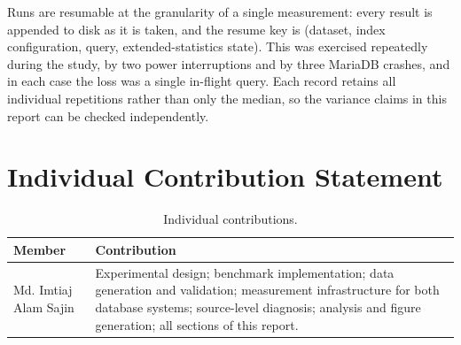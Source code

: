 \documentclass[12pt, a4paper]{article}
\begin{document}
Runs are resumable at the granularity of a single measurement: every
result is appended to disk as it is taken, and the resume key is
(dataset, index configuration, query, extended-statistics state). This
was exercised repeatedly during the study, by two power interruptions
and by three MariaDB crashes, and in each case the loss was a single
in-flight query. Each record retains all individual repetitions rather
than only the median, so the variance claims in this report can be
checked independently.

\section{Individual Contribution Statement}
\begin{table}[htbp]
\centering
\caption{Individual contributions.}
\label{tab:contrib}
\small
\begin{tabular}{@{}lp{9.5cm}@{}}
\toprule
\textbf{Member} & \textbf{Contribution} \\
\midrule
Md. Imtiaj Alam Sajin & Experimental design; benchmark implementation;
data generation and validation; measurement infrastructure for both
database systems; source-level diagnosis; analysis and figure
generation; all sections of this report. \\
\bottomrule
\end{tabular}
\end{table}
\end{document}
